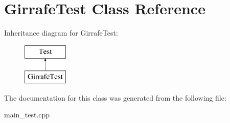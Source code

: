 \hypertarget{class_girrafe_test}{}\section{Girrafe\+Test Class Reference}
\label{class_girrafe_test}
Inheritance diagram for Girrafe\+Test\+:\begin{figure}[H]
\begin{center}
\leavevmode
\includegraphics[height=2.000000cm]{class_girrafe_test}
\end{center}
\end{figure}


The documentation for this class was generated from the following file\+:\begin{DoxyCompactItemize}
\item 
main\+\_\+test.\+cpp\end{DoxyCompactItemize}
